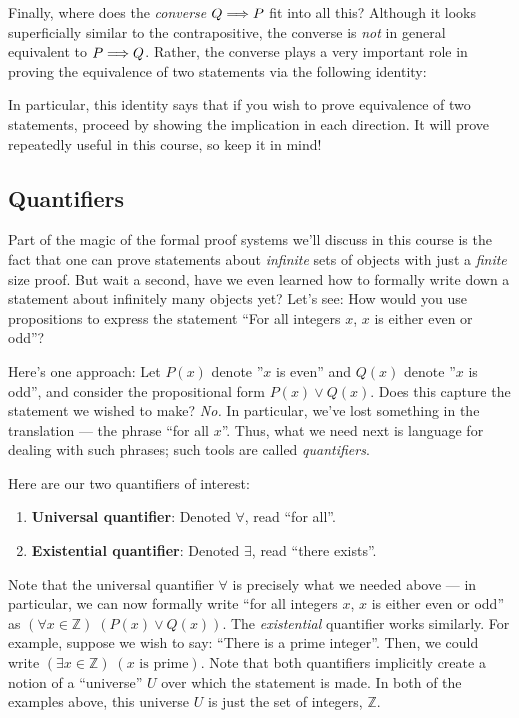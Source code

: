 \documentclass[11pt]{article}
\begin{document}
Finally, where does the \emph{converse} $Q\Longrightarrow P$ fit into all this? Although it looks superficially similar to the contrapositive, the converse is \emph{not} in general equivalent to $P\Longrightarrow Q$. Rather, the converse plays a very important role in proving the equivalence of two statements via the following identity:


In particular, this identity says that if you wish to prove equivalence of two statements, proceed by showing the implication in each direction. It will prove repeatedly useful in this course, so keep it in mind!

\subsection{Quantifiers} \label{sscn:quantifiers}

Part of the magic of the formal proof systems we'll discuss in this course is the fact that one can prove statements about \emph{infinite} sets of objects with just a \emph{finite} size proof. But wait a second, have we even learned how to formally write down a statement about infinitely many objects yet? Let's see:  How would you use propositions to express the statement ``For all integers $x$, $x$ is either even or odd''?

Here's one approach: Let $P(x)$ denote ''$x$ is even'' and $Q(x)$ denote ''$x$ is odd'', and consider the propositional form $P(x)\vee Q(x)$. Does this capture the statement we wished to make? \emph{No.} In particular, we've lost something in the translation --- the phrase ``for all $x$''. Thus, what we need next is language for dealing with such phrases; such tools are called \emph{quantifiers}.

Here are our two quantifiers of interest:
\vspace{-2mm}
\begin{enumerate}
    \item \textbf{Universal quantifier}: Denoted $\forall$, read ``for all''.
    \item \textbf{Existential quantifier}: Denoted $\exists$, read ``there exists''.
\end{enumerate}
\vspace{-2mm}
Note that the universal quantifier $\forall$ is precisely what we needed above --- in particular, we can now formally write ``for all integers $x$, $x$ is either even or odd'' as $(\forall x\in \mathbb{Z})\; (P(x)\vee Q(x))$. The \emph{existential} quantifier works similarly. For example, suppose we wish to say: ``There is a prime integer''. Then, we could write $(\exists x\in \mathbb{Z})\;(x\text{ is prime})$. Note that both quantifiers implicitly create a notion of a ``universe'' $U$ over which the statement is made. In both of the examples above, this universe $U$ is just the set of integers, $\mathbb{Z}$.
\end{document}
